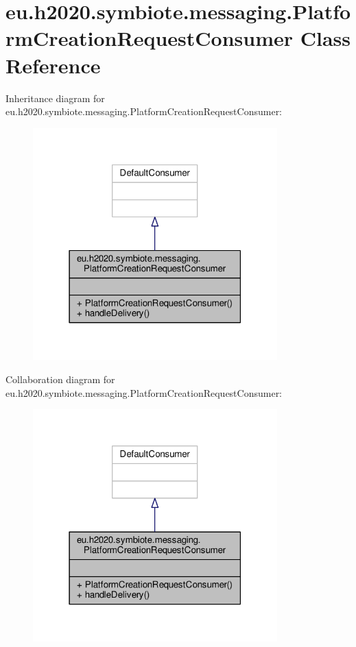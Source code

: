 \hypertarget{classeu_1_1h2020_1_1symbiote_1_1messaging_1_1PlatformCreationRequestConsumer}{}\section{eu.\+h2020.\+symbiote.\+messaging.\+Platform\+Creation\+Request\+Consumer Class Reference}
\label{classeu_1_1h2020_1_1symbiote_1_1messaging_1_1PlatformCreationRequestConsumer}


Inheritance diagram for eu.\+h2020.\+symbiote.\+messaging.\+Platform\+Creation\+Request\+Consumer\+:
\nopagebreak
\begin{figure}[H]
\begin{center}
\leavevmode
\includegraphics[width=267pt]{classeu_1_1h2020_1_1symbiote_1_1messaging_1_1PlatformCreationRequestConsumer__inherit__graph}
\end{center}
\end{figure}


Collaboration diagram for eu.\+h2020.\+symbiote.\+messaging.\+Platform\+Creation\+Request\+Consumer\+:
\nopagebreak
\begin{figure}[H]
\begin{center}
\leavevmode
\includegraphics[width=267pt]{classeu_1_1h2020_1_1symbiote_1_1messaging_1_1PlatformCreationRequestConsumer__coll__graph}
\end{center}
\end{figure}

